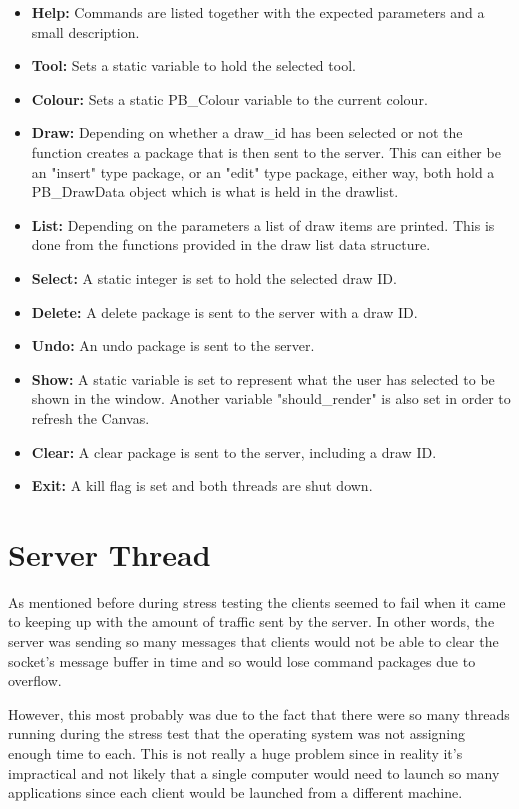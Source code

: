 \documentclass[12pt, a4paper]{report}
\begin{document}
\begin{itemize}
    \item \textbf{Help:} Commands are listed together with the expected parameters and a small description.
    \item \textbf{Tool:} Sets a static variable to hold the selected tool.
    \item \textbf{Colour:} Sets a static PB\_Colour variable to the current colour.
    \item \textbf{Draw:} Depending on whether a draw\_id has been selected or not the function creates a package that is then sent to the server. This can either be an "insert" type package, or an "edit" type package, either way, both hold a PB\_DrawData object which is what is held in the drawlist. 
    \item \textbf{List:} Depending on the parameters a list of draw items are printed. This is done from the functions provided in the draw list data structure.
    \item \textbf{Select:} A static integer is set to hold the selected draw ID.
    \item \textbf{Delete:} A delete package is sent to the server with a draw ID.
    \item \textbf{Undo:} An undo package is sent to the server.
    \item \textbf{Show:} A static variable is set to represent what the user has selected to be shown in the window. Another variable "should\_render" is also set in order to refresh the Canvas.
    \item \textbf{Clear:} A clear package is sent to the server, including a draw ID.
    \item \textbf{Exit:} A kill flag is set and both threads are shut down.
\end{itemize}



\section{Server Thread}
As mentioned before during stress testing the clients seemed to fail when it came to keeping up with the amount of traffic sent by the server. In other words, the server was sending so many messages that clients would not be able to clear the socket's message buffer in time and so would lose command packages due to overflow.

However, this most probably was due to the fact that there were so many threads running during the stress test that the operating system was not assigning enough time to each. This is not really a huge problem since in reality it's impractical and not likely that a single computer would need to launch so many applications since each client would be launched from a different machine.
\end{document}
